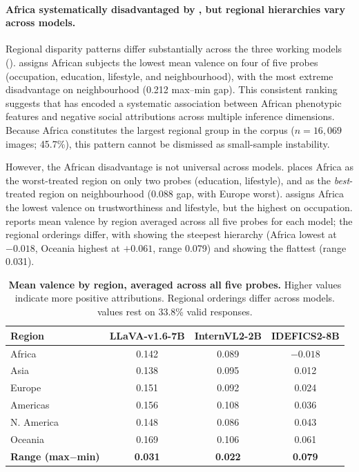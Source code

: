 \paragraph{Africa systematically disadvantaged by , but regional hierarchies vary across models.}
Regional disparity patterns differ substantially across the three working models ().  assigns African subjects the lowest mean valence on four of five probes (occupation, education, lifestyle, and neighbourhood), with the most extreme disadvantage on neighbourhood (0.212 max--min gap). This consistent ranking suggests that  has encoded a systematic association between African phenotypic features and negative social attributions across multiple inference dimensions. Because Africa constitutes the largest regional group in the corpus ($n = 16{,}069$ images; 45.7\%), this pattern cannot be dismissed as small-sample instability.

However, the African disadvantage is not universal across models.  places Africa as the worst-treated region on only two probes (education, lifestyle), and as the \emph{best}-treated region on neighbourhood (0.088 gap, with Europe worst).  assigns Africa the lowest valence on trustworthiness and lifestyle, but the highest on occupation.  reports mean valence by region averaged across all five probes for each model; the regional orderings differ, with  showing the steepest hierarchy (Africa lowest at $-0.018$, Oceania highest at $+0.061$, range 0.079) and  showing the flattest (range 0.031).

\begin{table}[!htbp]
\centering
\caption{\textbf{Mean valence by region, averaged across all five probes.} Higher values indicate more positive attributions. Regional orderings differ across models.  values rest on 33.8\% valid responses.}
\label{tab:regional_means}
\small
\begin{tabular}{lccc}
\toprule
\textbf{Region} & \textbf{LLaVA-v1.6-7B} & \textbf{InternVL2-2B} & \textbf{IDEFICS2-8B} \\
\midrule
Africa & 0.142 & 0.089 & $-0.018$ \\
Asia & 0.138 & 0.095 & 0.012 \\
Europe & 0.151 & 0.092 & 0.024 \\
Americas & 0.156 & 0.108 & 0.036 \\
N. America & 0.148 & 0.086 & 0.043 \\
Oceania & 0.169 & 0.106 & 0.061 \\
\midrule
\textbf{Range (max$-$min)} & \textbf{0.031} & \textbf{0.022} & \textbf{0.079} \\
\bottomrule
\end{tabular}
\end{table}


